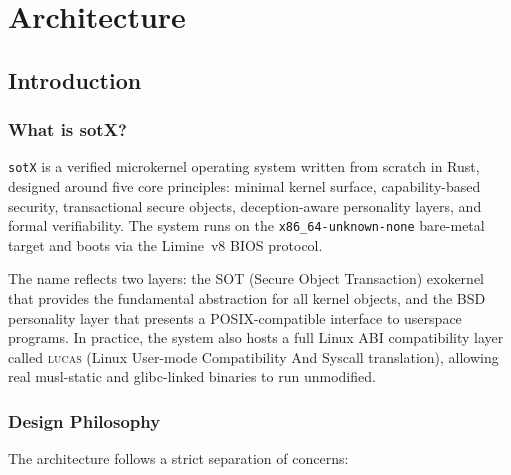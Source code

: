 \documentclass[11pt,a4paper,twoside]{report}
\theoremstyle{definition}
\newcommand{\sotX}{\texttt{sotX}}
\newcommand{\sotX}{\texttt{sotX}}
\newcommand{\LUCAS}{\textsc{lucas}}
\begin{document}
\part{Architecture}

\chapter{Introduction}
\label{ch:intro}

\section{What is sotX?}

\sotX{} is a verified microkernel operating system written from scratch in
Rust, designed around five core principles: minimal kernel surface, capability-based
security, transactional secure objects, deception-aware personality layers, and
formal verifiability. The system runs on the \texttt{x86\_64-unknown-none}
bare-metal target and boots via the Limine~v8 BIOS protocol.

The name reflects two layers: the SOT (Secure Object Transaction) exokernel
that provides the fundamental abstraction for all kernel objects, and the BSD
personality layer that presents a POSIX-compatible interface to userspace
programs. In practice, the system also hosts a full Linux ABI compatibility
layer called \LUCAS{} (Linux User-mode Compatibility And Syscall translation),
allowing real musl-static and glibc-linked binaries to run unmodified.

\section{Design Philosophy}

The architecture follows a strict separation of concerns:
\end{document}

